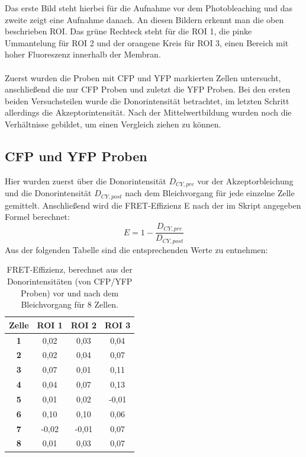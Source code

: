 \newpage
Das erste Bild steht hierbei für die Aufnahme vor dem Photobleaching und das zweite zeigt eine Aufnahme danach.
An diesen Bildern erkennt man die oben beschrieben ROI. Das grüne Rechteck steht für die ROI 1, die pinke Ummantelung für ROI 2
und der orangene Kreis für ROI 3, einen Bereich mit hoher Fluoreszenz innerhalb der Membran. \\\\
Zuerst wurden die Proben mit CFP und YFP markierten Zellen untersucht, anschließend
die nur CFP Proben und zuletzt die YFP Proben. Bei den ersten beiden Versuchsteilen wurde die 
Donorintensität betrachtet, im letzten Schritt allerdings die Akzeptorintensität. 
Nach der Mittelwertbildung wurden noch die Verhältnisse gebildet, um einen Vergleich 
ziehen zu können.
\subsection{CFP und YFP Proben}
Hier wurden zuerst über die Donorintensität $D_{CY,pre}$ vor der Akzeptorbleichung  
und die Donorintensität $D_{CY,post}$ nach dem Bleichvorgang für jede einzelne Zelle gemittelt. Anschließend 
wird die FRET-Effizienz E nach der im Skript angegeben Formel berechnet:
\begin{equation}
    E = 1 - \frac{D_{CY,pre}}{D_{CY,post}}
\end{equation}
Aus der folgenden Tabelle sind die entsprechenden Werte zu entnehmen:\\
\begin{table}[h]
    \centering
      \begin{tabular}{c|c|c|c}
      \textbf{Zelle} & \textbf{ROI 1} & \textbf{ROI 2} & \textbf{ROI 3} \\
      \hline
      \textbf{1} & 0,02  & 0,03  & 0,04 \\
      \textbf{2} & 0,02  & 0,04  & 0,07 \\
      \textbf{3} & 0,07  & 0,01  & 0,11 \\
      \textbf{4} & 0,04  & 0,07  & 0,13 \\
      \textbf{5} & 0,01  & 0,02  & -0,01 \\
      \textbf{6} & 0,10  & 0,10  & 0,06 \\
      \textbf{7} & -0,02 & -0,01 & 0,07 \\
      \textbf{8} & 0,01  & 0,03  & 0,07 \\
      \end{tabular}
      \caption{FRET-Effizienz, berechnet aus der Donorintensitäten (von CFP/YFP Proben) vor und nach dem Bleichvorgang für 8 Zellen.}
    \label{tab:FRET-Effizienz}
  \end{table}\\
